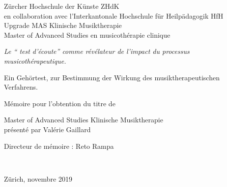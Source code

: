 
\begin{titlepage}
 \begin{center}
    \Large
     Zürcher Hochschule der Künste ZHdK\\
 	en collaboration avec l'Interkantonale Hochschule für
        Heilpädagogik HfH \\
	 Upgrade MAS Klinische Musiktherapie \\ Master of Advanced Studies en musicothérapie clinique\\
  \vfill
  { \LARGE
\emph{Le `` test d'écoute'' comme  révélateur de l'impact
  du processus musicothérapeutique.}\\ \bigskip


Ein Gehörtest, zur Bestimmung der Wirkung des musiktherapeutischen Verfahrens.} 
 \vfill
 
Mémoire pour l'obtention du titre de

Master of Advanced Studies Klinische Musiktherapie \\ présenté par Valérie Gaillard

{\large Directeur de mémoire : Reto Rampa}


 
	 \hfill \\
	 \rule{0mm}{1pt} \hfill 
{\large Zürich, novembre 2019}
 \end{center}
\end{titlepage}
